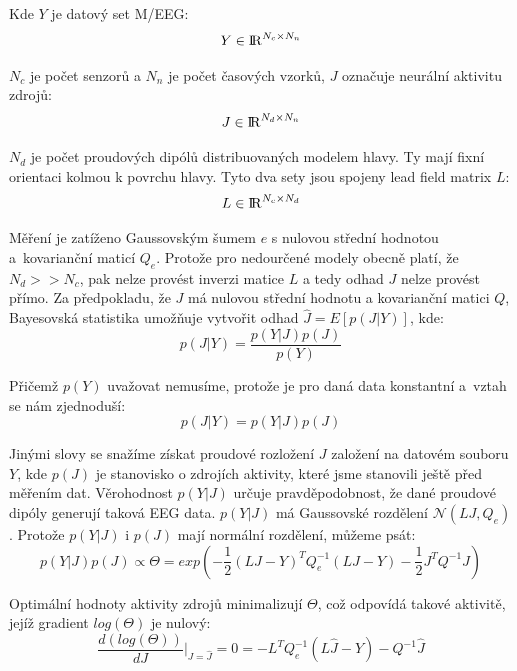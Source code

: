 Kde $Y$ je datový set M/EEG:
\begin{equation*}
Y \in {\rm I\!R}^{N_c \times N_n}
\end{equation*}

$N_c$ je počet senzorů a $N_n$ je počet časových vzorků, $J$ označuje neurální aktivitu zdrojů:
\begin{equation*}
J \in {\rm I\!R}^{N_d \times N_n}
\end{equation*}

$N_d$ je počet proudových dipólů distribuovaných modelem hlavy. Ty mají fixní orientaci kolmou k povrchu hlavy. Tyto dva sety jsou spojeny lead field matrix $L$:
\begin{equation*}
L \in {\rm I\!R}^{N_c \times N_d}
\end{equation*}

Měření je zatíženo Gaussovským šumem $e$ s nulovou střední hodnotou a~kovarianční maticí $Q_e$. Protože pro nedourčené modely obecně platí, že $N_d >> N_c$, pak nelze provést inverzi matice $L$ a tedy odhad $J$ nelze provést přímo. Za předpokladu, že $J$ má nulovou střední hodnotu a kovarianční matici $Q$, Bayesovská statistika umožňuje vytvořit odhad $\hat{J} = E[p(J|Y)]$, kde:
\begin{equation}
p(J|Y) = \frac{p(Y|J)p(J)}{p(Y)}
\end{equation}

Přičemž $p(Y)$ uvažovat nemusíme, protože je pro daná data konstantní a~vztah se nám zjednoduší:
\begin{equation}
p(J|Y) = p(Y|J)p(J)
\end{equation}

Jinými slovy se snažíme získat proudové rozložení $J$ založení na datovém souboru $Y$, kde $p(J)$ je stanovisko o zdrojích aktivity, které jsme stanovili ještě před měřením dat. Věrohodnost $p(Y|J)$ určuje pravděpodobnost, že dané proudové dipóly generují taková EEG data. $p(Y|J)$ má Gaussovské rozdělení $\mathcal{N}(LJ,Q_e)$. Protože $p(Y|J)$ i $p(J)$ mají normální rozdělení, můžeme psát:
\begin{equation}
p(Y|J)p(J) \propto \Theta = exp(-\frac{1}{2} (LJ-Y)^T Q^{-1}_e (LJ-Y)-\frac{1}{2}J^T Q^{-1} J)
\end{equation}

Optimální hodnoty aktivity zdrojů minimalizují $\Theta$, což odpovídá takové aktivitě, jejíž gradient $log(\Theta)$ je nulový:
\begin{equation}
\frac{d(log(\Theta))}{dJ} \Bigg\vert_{J = \hat{J}} = 0 = -L^T Q^{-1}_e (L\hat{J}-Y) - Q^{-1} \hat{J} 
\end{equation}

